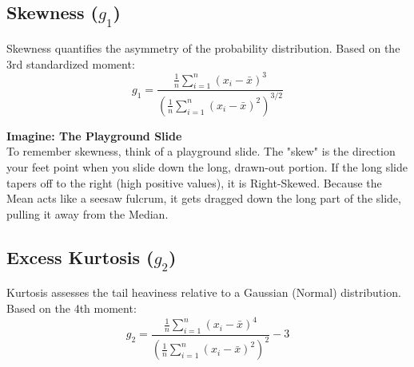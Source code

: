 \documentclass[12pt]{article}
\begin{document}
\subsection*{Skewness ($g_1$)}
Skewness quantifies the asymmetry of the probability distribution. Based on the 3rd standardized moment:
\[ g_1 = \frac{\frac{1}{n} \sum_{i=1}^{n} (x_i - \bar{x})^3}{\left( \frac{1}{n} \sum_{i=1}^{n} (x_i - \bar{x})^2 \right)^{3/2}} \]

\vspace{0.2cm}
\begin{center}
\end{center}

\vspace{0.5em}
\noindent\textbf{Imagine: The Playground Slide}\\
To remember skewness, think of a playground slide. The "skew" is the direction your feet point when you slide down the long, drawn-out portion. If the long slide tapers off to the right (high positive values), it is Right-Skewed. Because the Mean acts like a seesaw fulcrum, it gets dragged down the long part of the slide, pulling it away from the Median.

\subsection*{Excess Kurtosis ($g_2$)}
Kurtosis assesses the tail heaviness relative to a Gaussian (Normal) distribution. Based on the 4th moment:
\[ g_2 = \frac{\frac{1}{n} \sum_{i=1}^{n} (x_i - \bar{x})^4}{\left( \frac{1}{n} \sum_{i=1}^{n} (x_i - \bar{x})^2 \right)^2} - 3 \]
\end{document}
